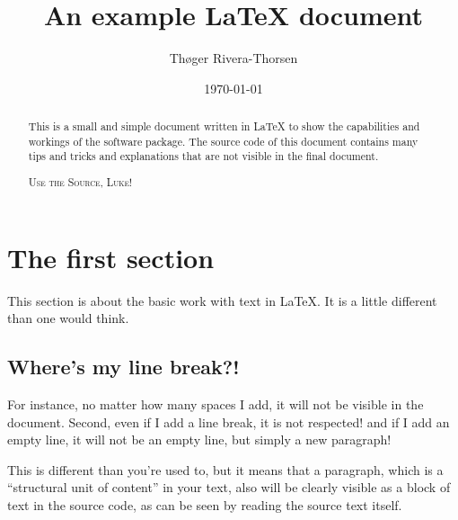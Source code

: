\documentclass[a4paper, 11pt]{article} %
\title{An example \LaTeX{} document}
\author{Thøger Rivera-Thorsen}
\date{\today}
\begin{document}
\maketitle

\begin{abstract}
This is a small and simple document written in \LaTeX{} to show the 
capabilities and workings of the software package. The source code of this
document contains many tips and tricks and explanations that are not visible in
the final document.

\textsc{Use the Source, Luke!}
\end{abstract}

\tableofcontents
\newpage
\listoffigures
\listoftables
\newpage


\section{The first section}

This section is about the basic work with text in \LaTeX{}.  It is a little
different than one would think.  


%   


\subsection{Where's my line break?! \label{sec:linbre}}

For instance, no matter how many spaces I            add, it will not be 
visible in the document. 
Second, even if I add a line break, it is not respected! and if I add an empty
line, it will not be an empty line, but simply a new paragraph!

This is different than you're used to, but it means that a paragraph, which is
a ``structural unit of content'' in your text, also will be clearly visible as
a block of text in the source code, as can be seen by reading the source text
itself.
\end{document}
